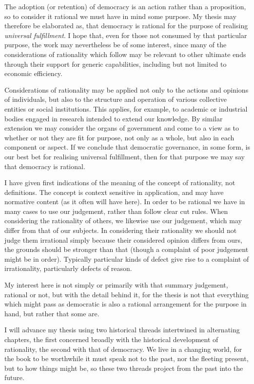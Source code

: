 The adoption (or retention) of democracy is an action rather than a  proposition, so to consider it rational we must have in mind some purpose.
My thesis may therefore be elaborated as, that democracy is rational for the purpose of realising \emph{universal fulfillment}.
I hope that, even for those not consumed by that particular purpose, the work may nevertheless be of some interest, since many of the considerations of rationality which follow may be relevant to other ultimate ends through their support for generic capabilities, including but not limited to economic efficiency.

Considerations of rationality may be applied not only to the actions and opinions of individuals, but also to the structure and operation of various collective entities or social institutions.
This applies, for example, to academic or industrial bodies engaged in research intended to extend our knowledge.
By similar extension we may consider the organs of government and come to a view as to whether or not they are fit for purpose, not only as a whole, but also in each component or aspect.
If we conclude that democratic governance, in some form, is our best bet for realising universal fulfillment, then for that purpose we may say that democracy is rational.

I have given first indications of the meaning of the concept of rationality, not definitions.
The concept is context sensitive in application, and may have normative content (as it often will have here).
In order to be rational we have in many cases to use our judgement, rather than follow clear cut rules.
When considering the rationality of others, we likewise use our judgement, which may differ from that of our subjects.
In considering their rationality we should not judge them irrational simply because their considered opinion differs from ours, the grounds should be stronger than that (though a complaint of poor judgement might be in order).
Typically particular kinds of defect give rise to a complaint of irrationality, particularly defects of reason.

My interest here is not simply or primarily with that summary judgement, rational or not, but with the detail behind it, for the thesis is not that everything which might pass as democratic is also a rational arrangement for the purpose in hand, but rather that some are.

I will advance my thesis using two historical threads intertwined in alternating chapters,
the first concerned broadly with the historical development of rationality, the second with that of democracy.
We live in a changing world, for the book to be worthwhile it must speak not to the past, nor the fleeting present, but to how things might be, so these two threads project from the past into the future.

